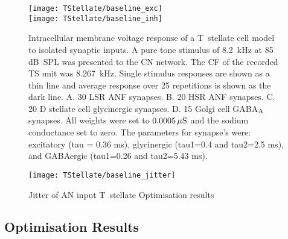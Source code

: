 \begin{figure}[htb]
\centering%
\texttt{[image: TStellate/baseline\_exc]}\\
\texttt{[image: TStellate/baseline\_inh]}
\caption[Response of T~stellate cells to isolated synaptic inputs]%
{Intracellular membrane voltage response of a T~stellate cell model to isolated synaptic inputs.
A pure tone stimulus of 8.2~kHz at 85 dB~SPL was presented to the CN network. The CF of the recorded TS unit was 8.267~kHz.
Single stimulus responses are shown as a thin line and average response over 25 repetitions is shown as the dark line.
A. 30 LSR ANF synapses.
B. 20 HSR ANF synapses.
C. 20 D stellate cell glycinergic synapses.
D. 15 Golgi cell GABA$_{\rm A}$ synapses.
All weights were set to $0.0005\,\mu{\rm S}$ and the sodium conductance set to zero.
The parameters for synapse's were: excitatory (tau = 0.36 ms), glycinergic (tau1=0.4 and tau2=2.5 ms), and GABAergic (tau1=0.26 and tau2=5.43 ms).\label{fig:TSinputs}}
\end{figure}

\begin{figure}[htb]
\centering%
\texttt{[image: TStellate/baseline\_jitter]}
\caption[]{Jitter of AN input T~stellate Optimisation results}\label{fig:CSjitter}
\end{figure}



\clearpage
\subsection{Optimisation Results}

